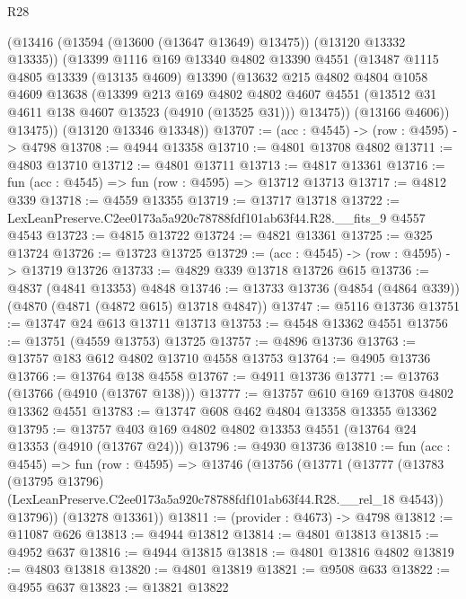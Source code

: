 \begin{lexlean}{R28}
\begin{coremodule}
        (@13416 (@13594 (@13600 (@13647 @13649) @13475)) (@13120 @13332 @13335))
        (@13399
          @1116
          @169
          @13340
          @4802
          @13390
          @4551
          (@13487
            @1115
            @4805
            @13339
            (@13135 @4609)
            @13390
            (@13632
              @215
              @4802
              @4804
              @1058
              @4609
              @13638
              (@13399
                @213
                @169
                @4802
                @4802
                @4607
                @4551
                (@13512 @31 @4611 @138 @4607 @13523 (@4910 (@13525 @31)))
                @13475))
            (@13166 @4606))
          @13475))
      (@13120 @13346 @13348))
@13707 := (acc : @4545) -> (row : @4595) -> @4798
@13708 := @4944 @13358
@13710 := @4801 @13708 @4802
@13711 := @4803 @13710
@13712 := @4801 @13711
@13713 := @4817 @13361
@13716 := fun (acc : @4545) => fun (row : @4595) => @13712 @13713
@13717 := @4812 @339
@13718 := @4559 @13355
@13719 := @13717 @13718
@13722 := LexLeanPreserve.C2ee0173a5a920c78788fdf101ab63f44.R28.__fits_9 @4557 @4543
@13723 := @4815 @13722
@13724 := @4821 @13361
@13725 := @325 @13724
@13726 := @13723 @13725
@13729 := (acc : @4545) -> (row : @4595) -> @13719 @13726
@13733 := @4829 @339 @13718 @13726 @615
@13736 := @4837 (@4841 @13353) @4848
@13746 := @13733 @13736 (@4854 (@4864 @339)) (@4870 (@4871 (@4872 @615) @13718 @4847))
@13747 := @5116 @13736
@13751 := @13747 @24 @613 @13711 @13713
@13753 := @4548 @13362 @4551
@13756 := @13751 (@4559 @13753) @13725
@13757 := @4896 @13736
@13763 := @13757 @183 @612 @4802 @13710 @4558 @13753
@13764 := @4905 @13736
@13766 := @13764 @138 @4558
@13767 := @4911 @13736
@13771 := @13763 (@13766 (@4910 (@13767 @138)))
@13777 := @13757 @610 @169 @13708 @4802 @13362 @4551
@13783 := @13747 @608 @462 @4804 @13358 @13355 @13362
@13795 := @13757 @403 @169 @4802 @4802 @13353 @4551 (@13764 @24 @13353 (@4910 (@13767 @24)))
@13796 := @4930 @13736
@13810 := fun (acc : @4545) =>
  fun (row : @4595) =>
  @13746
    (@13756
      (@13771
        (@13777
          (@13783
            (@13795 @13796)
            (LexLeanPreserve.C2ee0173a5a920c78788fdf101ab63f44.R28.__rel_18 @4543))
          @13796))
      (@13278 @13361))
@13811 := (provider : @4673) -> @4798
@13812 := @11087 @626
@13813 := @4944 @13812
@13814 := @4801 @13813
@13815 := @4952 @637
@13816 := @4944 @13815
@13818 := @4801 @13816 @4802
@13819 := @4803 @13818
@13820 := @4801 @13819
@13821 := @9508 @633
@13822 := @4955 @637
@13823 := @13821 @13822

\end{coremodule}
\end{lexlean}
